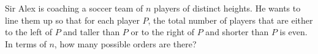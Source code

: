 Sir Alex is coaching a soccer team of $n$ players of distinct heights. He wants to line them up so that for each player $P$, the total number of players that are either to the left of $P$ and taller than $P$ or to the right of $P$ and shorter than $P$ is even. In terms of $n$, how many possible orders are there?